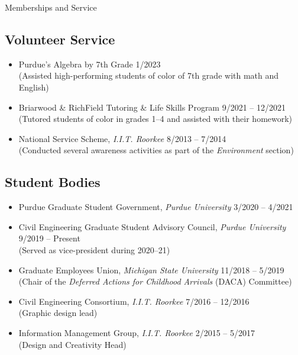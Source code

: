 \documentclass{CV} %
\begin{document}
\begin{rSection}{Memberships and Service}
    \subsection*{Volunteer Service}
    \begin{itemize}
        \item Purdue's Algebra by 7th Grade \hfill 1/2023
        \\ (Assisted high-performing students of color of 7th grade with math and English)
        \item Briarwood \& RichField Tutoring \& Life Skills Program \hfill 9/2021 – 12/2021
        \\ (Tutored students of color in grades 1–4 and assisted with their homework)
        \item National Service Scheme, \textit{I.I.T. Roorkee} \hfill 8/2013 – 7/2014
        \\ (Conducted several awareness activities as part of the \textit{Environment} section)
    \end{itemize}
    \subsection*{Student Bodies}
    \begin{itemize}
        \item Purdue Graduate Student Government, \textit{Purdue University} \hfill 3/2020 – 4/2021
        \item Civil Engineering Graduate Student Advisory Council, \textit{Purdue University} \hfill 9/2019 – Present \\
        (Served as vice-president during 2020–21)
        \item Graduate Employees Union, \textit{Michigan State University} \hfill 11/2018 – 5/2019 \\
        (Chair of the \emph{Deferred Actions for Childhood Arrivals} (DACA) Committee)
        \item Civil Engineering Consortium, \textit{I.I.T. Roorkee} \hfill 7/2016 – 12/2016
        \\ (Graphic design lead)
        \item Information Management Group, \textit{I.I.T. Roorkee} \hfill 2/2015 – 5/2017
        \\ (Design and Creativity Head)
    \end{itemize}
\end{rSection}
\end{document}
